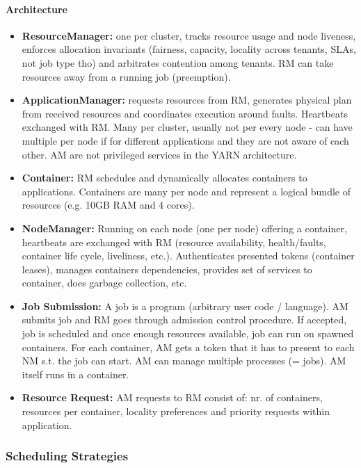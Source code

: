 \paragraph{Architecture}
\begin{itemize}
    \item \textbf{ResourceManager:} one per cluster, tracks resource usage and node liveness, enforces allocation invariants (fairness, capacity, locality across tenants, SLAs, not job type tho) and arbitrates contention among tenants. RM can take resources away from a running job (preemption).
    \item \textbf{ApplicationManager:} requests resources from RM, generates physical plan from received resources and coordinates execution around faults. Heartbeats exchanged with RM. Many per cluster, usually not per every node - can have multiple per node if for different applications and they are not aware of each other. AM are not privileged services in the YARN architecture.
    \item \textbf{Container:} RM schedules and dynamically allocates containers to applications. Containers are many per node and represent a logical bundle of resources (e.g. 10GB RAM and 4 cores).
    \item \textbf{NodeManager:} Running on each node (one per node) offering a container, heartbeats are exchanged with RM (resource availability, health/faults, container life cycle, liveliness, etc.). Authenticates presented tokens (container leases), manages containers dependencies, provides set of services to container, does garbage collection, etc.
    \item \textbf{Job Submission:} A job is a program (arbitrary user code / language). AM submits job and RM goes through admission control procedure. If accepted, job is scheduled and once enough resources available, job can run on spawned containers. For each container, AM gets a token that it has to present to each NM s.t. the job can start. AM can manage multiple processes (= jobs). AM itself runs in a container.
    \item \textbf{Resource Request:} AM requests to RM consist of: nr. of containers, resources per container, locality preferences and priority requests within application.
\end{itemize}


\subsubsection{Scheduling Strategies}

